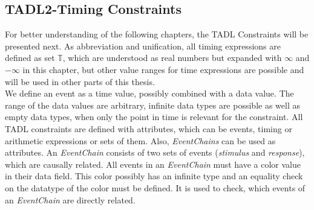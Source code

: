 \subsection{TADL2-Timing Constraints}
	\label{tadl2Constraints}
	For better understanding of the following chapters, the TADL Constraints will be presented next. As abbreviation and unification, all timing expressions are defined as set $\mathbb{T}$, which are understood as real numbers but expanded with $\infty$ and $-\infty$ in this chapter, but other value ranges for time expressions are possible and will be used in other parts of this thesis.\\
	We define an event as a time value, possibly combined with a data value. The range of the data values are arbitrary, infinite data types are possible as well as empty data types, when only the point in time is relevant for the constraint. All TADL constraints are defined with attributes, which can be events, timing or arithmetic expressions or sets of them. Also, \emph{EventChains} can be used as attributes. An \emph{EventChain} consists of two sets of events (\emph{stimulus} and \emph{response}),  which are causally related. All events in an \emph{EventChain} must have a color value in their data field. This color possibly has an infinite type and an equality check on the datatype of the color must be defined. It is used to check, which events of an \emph{EventChain} are directly related.
